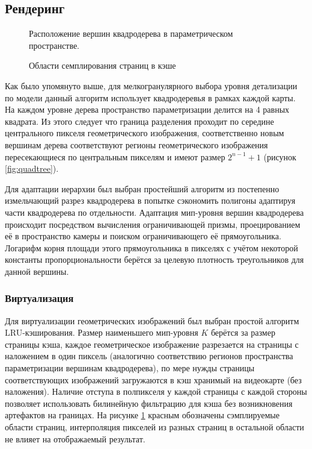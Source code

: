 \subsection{Рендеринг}
\begin{figure}[t]
  \centering
  \caption{Расположение вершин квадродерева в параметрическом пространстве.}
  \label{fig:quadtree}
\endminipage\hfill
%
  \centering
  \caption{Области семплирования страниц в кэше }
  \label{fig:cache}
\endminipage
\end{figure}
Как было упомянуто выше, для мелкогранулярного выбора уровня детализации по модели данный алгоритм использует квадродеревья в рамках каждой карты. На каждом уровне дерева пространство параметризации делится на 4 равных квадрата. Из этого следует что граница разделения проходит по середине центрального пикселя геометрического изображения, соответственно новым вершинам дерева соответствуют регионы геометрического изображения пересекающиеся по центральным пикселям и имеют размер $2^{n-1} + 1$ (рисунок \ref{fig:quadtree}).

Для адаптации иерархии был выбран простейший алгоритм из \cite{niski2007multi} постепенно измельчающий разрез квадродерева в попытке сэкономить полигоны адаптируя части квадродерева по отдельности. Адаптация мип-уровня вершин квадродерева происходит посредством вычисления ограничивающей призмы, проецированием её в пространство камеры и поиском ограничивающего её прямоугольника. Логарифм корня площади этого прямоугольника в пикселях с учётом некоторой константы пропорциональности берётся за целевую плотность треугольников для данной вершины.


\subsubsection{Виртуализация}
Для виртуализации геометрических изображений был выбран простой алгоритм LRU-кэширования. Размер наименьшего мип-уровня $K$ берётся за размер страницы кэша, каждое геометрическое изображение разрезается на страницы с наложением в один пиксель (аналогично соответствию регионов пространства параметризации вершинам квадродерева), по мере нужды страницы соответствующих изображений загружаются в кэш хранимый на видеокарте (без наложения). Наличие отступа в полпикселя у каждой страницы с каждой стороны позволяет использовать билинейную фильтрацию для кэша без возникновения артефактов на границах. На рисунке \ref{fig:cache} красным обозначены сэмплируемые области страниц, интерполяция пикселей из разных страниц в остальной области не влияет на отображаемый результат.

